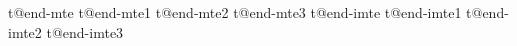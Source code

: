 %
%
%
%


\newif\if@ntromarker
\newif\if@ntro \newif\ift@tle \newif\ifb@dy \newif\ifNoBody
\newif\ifbeenb@dy
\newif\ifstartpara
\newif\ifintr@done\intr@donefalse %
\newif\ifReenterIntroOK\ReenterIntroOKtrue %
\newif\ifinextended \inextendedfalse %
\newcount\l@stparbadness
\def\EndTitle#1{\x@\let\csname at@end-#1\endcsname\tr@e} %
\EndTitle{mte} \EndTitle{mte1} \EndTitle{mte2} \EndTitle{mte3}
\EndTitle{imte} \EndTitle{imte1} \EndTitle{imte2} \EndTitle{imte3}

\def\initp@rastyles{\@ntrofalse \t@tlefalse \b@dyfalse \def\m@rker{p}\hsize=\textwidth}

